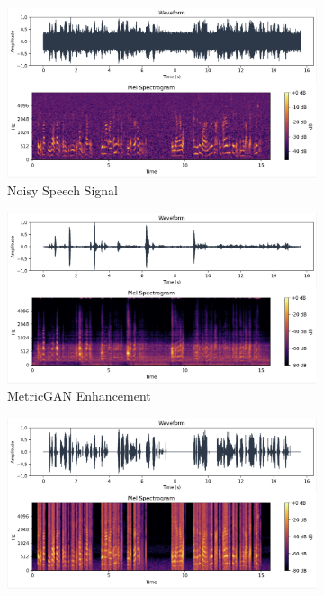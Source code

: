\begin{figure}[H]
    \centering
         \begin{subfigure}[b]{0.3\textwidth}
             \centering
             \includegraphics[width=\textwidth]{figures/snr0_o.png}
             \caption{Noisy Speech Signal}
             \label{fig:y equals x}
         \end{subfigure}
         \hfill
         \begin{subfigure}[b]{0.3\textwidth}
             \centering
             \includegraphics[width=\textwidth]{figures/snr0_e.png}
             \caption{MetricGAN Enhancement}
             \label{fig:three sin x}
         \end{subfigure}
         \hfill
         \begin{subfigure}[b]{0.3\textwidth}
             \centering
             \includegraphics[width=\textwidth]{figures/snr0_w.png}

\end{subfigure}
\end{figure}
